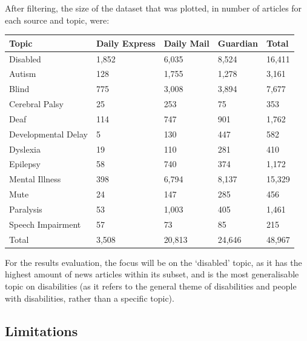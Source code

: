 \documentclass{report}
\begin{document}
After filtering, the size of the dataset that was plotted, in number of articles for each source and topic,  were:

\begin{center}
	\begin{tabu} to 1.0\textwidth { | X[c] | X[c] | X[c] | X[c] | X[c] | }
		\hline
		Topic & Daily Express & Daily Mail & Guardian & Total \\
		\hline
		Disabled & 1,852 & 6,035 & 8,524 & 16,411  \\
		\hline
		Autism & 128 & 1,755 & 1,278 & 3,161  \\
		\hline
		Blind & 775 & 3,008 & 3,894 & 7,677  \\
		\hline
		Cerebral Palsy & 25 & 253 & 75 & 353  \\
		\hline
		Deaf & 114 & 747 & 901 & 1,762  \\
		\hline
		Developmental Delay & 5 & 130 & 447 & 582  \\
		\hline
		Dyslexia & 19 & 110 & 281 & 410  \\
		\hline
		Epilepsy & 58 & 740 & 374 & 1,172  \\
		\hline
		Mental Illness & 398 & 6,794 & 8,137 & 15,329  \\
		\hline
		Mute & 24 & 147 & 285 & 456  \\
		\hline
		Paralysis & 53 & 1,003 & 405 & 1,461  \\
		\hline
		Speech Impairment & 57 & 73 & 85 & 215  \\
		\hline
		Total & 3,508 & 20,813 & 24,646 & 48,967  \\ 
		\hline
	\end{tabu}
\end{center}

For the results evaluation, the focus will be on the `disabled' topic, as it has the highest amount of news articles within its subset, and is the most generalisable topic on disabilities (as it refers to the general theme of disabilities and people with disabilities, rather than a specific topic).

\subsection{Limitations} \label{limitations}
\end{document}
